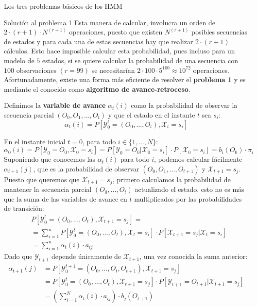 \begin{section}{Los tres problemas básicos de los HMM}
\begin{subsection}{Solución al problema 1}
Esta manera de calcular, involucra un orden de $2\cdot(r+1)\cdot N^{(r+1)}$ operaciones, puesto que existen $N^{(r+1)}$ posibles secuencias de estados y para cada una de estas secuencias hay que realizar $2\cdot(r+1)$ cálculos. Esto hace imposible calcular esta probabilidad, pues incluso para un modelo de $5$ estados, si se quiere calcular la probabilidad de una secuencia con $100$ observaciones $(r=99)$ se necesitarían $2\cdot100\cdot5^{100}\approx10^{72}$ operaciones. Afortunadamente, existe una forma más eficiente de resolver el \textbf{problema 1} y es mediante el conocido como \textbf{algoritmo de avance-retroceso}. 

\begin{definition}
Definimos la \textbf{variable de avance} $\alpha_t(i)$ como la probabilidad de observar la secuencia parcial $(O_0,O_1,\dots,O_t)$ y que el estado en el instante $t$ sea $s_i$:
\[ \alpha_t(i)=P[\mathcal{Y}_0^t=(O_0,\dots,O_t), \mathcal{X}_t=s_i]\]
\end{definition}
En el instante inicial $t=0$, para todo $i\in\{1,\dots,N\}$:
\[ \alpha_0(i)=P[\mathcal{Y}_0=O_0, \mathcal{X}_0=s_i]=P[\mathcal{Y}_0=O_0|\mathcal{X}_0=s_i]\cdot P[\mathcal{X}_0=s_i]=b_i(O_0)\cdot\pi_i\]
Suponiendo que conocemos las $\alpha_{t}(i)$ para todo $i$, podemos calcular fácilmente $\alpha_{t+1}(j)$, que es la probabilidad de observar $(O_0,O_1,\dots,O_{t+1})$ y $\mathcal{X}_{t+1}=s_j$. Puesto que queremos que $\mathcal{X}_{t+1}=s_j$, primero calculamos la probabilidad de mantener la secuencia parcial $(O_0,\dots,O_t)$ actualizado el estado, esto no es más que la suma de las variables de avance en $t$ multiplicados por las probabilidades de transición:
\[
\begin{aligned}
    &P[\mathcal{Y}_0^t=(O_0,\dots,O_t), \mathcal{X}_{t+1}=s_j]=\\
    &=\sum_{i=1}^nP[\mathcal{Y}_0^t=(O_0,\dots,O_t), \mathcal{X}_{t}=s_i]\cdot P[\mathcal{X}_{t+1}=s_j|\mathcal{X}_{t}=s_i]\\
    &=\sum_{i=1}^n\alpha_{t}(i)\cdot a_{ij}
\end{aligned}    
\]
Dado que $\mathcal{Y}_{t+1}$ depende únicamente de $\mathcal{X}_{t+1}$, una vez conocida la suma anterior:
\[
\begin{aligned}
    \alpha_{t+1}(j)&=P[\mathcal{Y}_0^{t+1}=(O_0,\dots,O_t,O_{t+1}), \mathcal{X}_{t+1}=s_j]\\
    &=P[\mathcal{Y}_0^t=(O_0,\dots,O_t), \mathcal{X}_{t+1}=s_j]\cdot P[\mathcal{Y}_{t+1}=O_{t+1}|\mathcal{X}_{t+1}=s_j]\\
    &=\left(\sum_{i=1}^N\alpha_{t}(i)\cdot a_{ij}\right)\cdot b_j(O_{t+1})
\end{aligned}
\]


\end{subsection}
\end{section}
